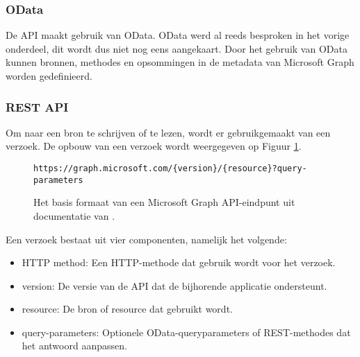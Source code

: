 \subsubsection{OData}

De \ac{API} maakt gebruik van OData. OData werd al reeds besproken in het vorige onderdeel, dit wordt dus niet nog eens aangekaart. Door het gebruik van OData kunnen bronnen, methodes en opsommingen in de metadata van Microsoft Graph worden gedefinieerd.

\subsubsection{REST API}

Om naar een bron te schrijven of te lezen, wordt er gebruikgemaakt van een verzoek. De opbouw van een verzoek wordt weergegeven op Figuur \ref{RAM}. \\

\begin{figure}[h]
    \scriptsize
    \begin{verbatim}
https://graph.microsoft.com/{version}/{resource}?query-parameters
    \end{verbatim}    
    \caption[Basis formaat Microsoft Graph API-eindpunt]{Het basis formaat van een Microsoft Graph \Ac{API}-eindpunt uit documentatie van \textcite{Microsoft2023o}.}
    \label{RAM}
\end{figure}

Een verzoek bestaat uit vier componenten, namelijk het volgende: 

\begin{itemize}
    \item \ac{HTTP} method: Een \ac{HTTP}-methode dat gebruik wordt voor het verzoek.
    \item version: De versie van de \ac{API} dat de bijhorende applicatie ondersteunt.
    \item resource: De bron of resource dat gebruikt wordt.
    \item query-parameters: Optionele OData-queryparameters of \Ac{REST}-methodes dat het antwoord aanpassen.
\end{itemize}

\begin{comment}
Wanneer er een verzoek wordt verstuurd, krijgt dit ook een antwoord terug. Een antwoord bestaat uit minstens volgende onderdelen: 

\begin{itemize}
    \item Status code:
    \item Response message:
    \item @odata.nextLink:
\end{itemize}
\end{comment}

